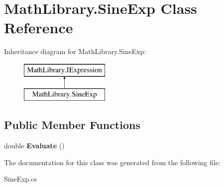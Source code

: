 \hypertarget{class_math_library_1_1_sine_exp}{}\section{Math\+Library.\+Sine\+Exp Class Reference}
\label{class_math_library_1_1_sine_exp}
Inheritance diagram for Math\+Library.\+Sine\+Exp\+:\begin{figure}[H]
\begin{center}
\leavevmode
\includegraphics[height=2.000000cm]{class_math_library_1_1_sine_exp}
\end{center}
\end{figure}
\subsection*{Public Member Functions}
\begin{DoxyCompactItemize}
\item 
\mbox{\label{class_math_library_1_1_sine_exp_a595797d425688fa2b6d581b3ec4e4606}} 
double {\bfseries Evaluate} ()
\end{DoxyCompactItemize}


The documentation for this class was generated from the following file\+:\begin{DoxyCompactItemize}
\item 
Sine\+Exp.\+cs\end{DoxyCompactItemize}
